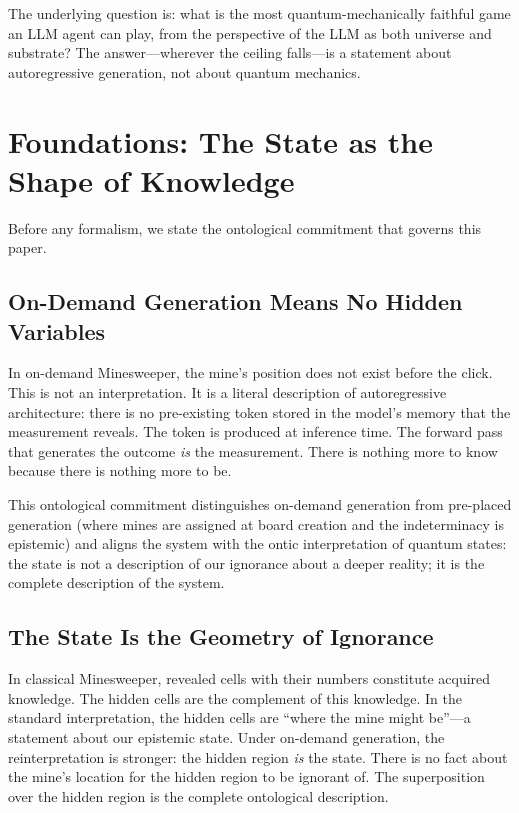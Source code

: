 \documentclass[12pt,a4paper]{article}
\theoremstyle{definition}
\theoremstyle{remark}
\begin{document}
The underlying question is: what is the most quantum-mechanically faithful game an LLM agent can play, from the perspective of the LLM as both universe and substrate?  The answer---wherever the ceiling falls---is a statement about autoregressive generation, not about quantum mechanics.


\section{Foundations: The State as the Shape of Knowledge}
\label{sec:foundations}

Before any formalism, we state the ontological commitment that governs this paper.

\subsection{On-Demand Generation Means No Hidden Variables}

In on-demand Minesweeper, the mine's position does not exist before the click.  This is not an interpretation.  It is a literal description of autoregressive architecture: there is no pre-existing token stored in the model's memory that the measurement reveals.  The token is produced at inference time.  The forward pass that generates the outcome \emph{is} the measurement.  There is nothing more to know because there is nothing more to be.

This ontological commitment distinguishes on-demand generation from pre-placed generation (where mines are assigned at board creation and the indeterminacy is epistemic) and aligns the system with the ontic interpretation of quantum states: the state is not a description of our ignorance about a deeper reality; it is the complete description of the system.

\subsection{The State Is the Geometry of Ignorance}

In classical Minesweeper, revealed cells with their numbers constitute acquired knowledge.  The hidden cells are the complement of this knowledge.  In the standard interpretation, the hidden cells are ``where the mine might be''---a statement about our epistemic state.  Under on-demand generation, the reinterpretation is stronger: the hidden region \emph{is} the state.  There is no fact about the mine's location for the hidden region to be ignorant of.  The superposition over the hidden region is the complete ontological description.
\end{document}
